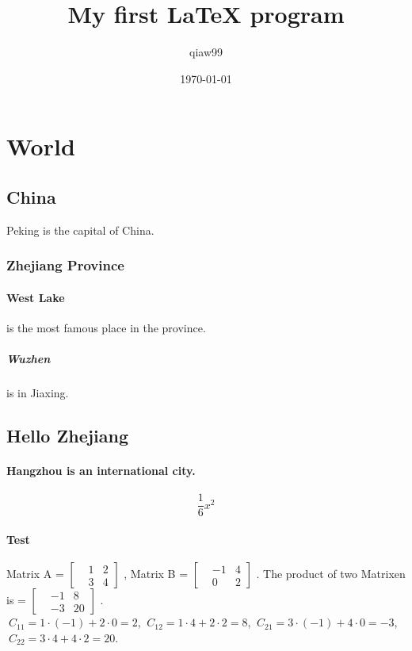 \documentclass{article}
\title{My first LaTeX program}
\author{qiaw99}
\date{\today}
\begin{document}
	\maketitle
	\section{World}
	\subsection{China}
	Peking is the capital of China.
	\subsubsection{Zhejiang Province}
	\paragraph{West Lake}
	is the most famous place in the province.
	\subparagraph{Wuzhen}
	is in Jiaxing.
	\subsection{Hello Zhejiang}
	\paragraph{Hangzhou is an international city.}
	\[\frac{1}{6}x^{2}\]
	\paragraph{Test}
	Matrix A = 
	$\begin{bmatrix}
		&1 &2 \\
		&3 &4
	\end{bmatrix}$
	, Matrix B = 
	$\begin{bmatrix}
		&-1 &4 \\
		&0 &2
	\end{bmatrix}$
	. The product of two Matrixen is = 
	$\begin{bmatrix}
	&-1 &8 \\
	&-3 &20
	\end{bmatrix}$
	.\\
	$\ C_{11} = 1\cdot(-1)+2\cdot0=2$,
	$\ C_{12} = 1\cdot4+2\cdot2=8$,
	$\ C_{21} = 3\cdot(-1)+4\cdot0=-3$,
	$\ C_{22} = 3\cdot4+4\cdot2=20$.
\end{document}
